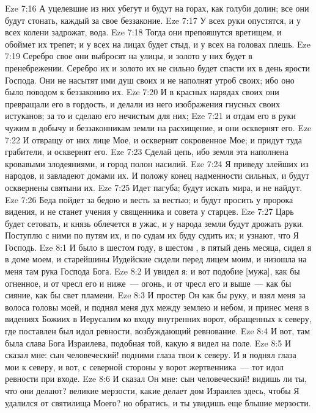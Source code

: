 \vs Eze 7:16 А уцелевшие из них убегут и будут на горах, как голуби долин; все они будут стонать, каждый за свое беззаконие.
\vs Eze 7:17 У всех руки опустятся, и у всех колени задрожат,  вода.
\vs Eze 7:18 Тогда они препояшутся вретищем, и обоймет их трепет; и у всех на лицах будет стыд, и у всех на головах плешь.
\vs Eze 7:19 Серебро свое они выбросят на улицы, и золото у них будет в пренебрежении. Серебро их и золото их не сильно будет спасти их в день ярости Господа. Они не насытят ими душ своих и не наполнят утроб своих; ибо оно было поводом к беззаконию их.
\vs Eze 7:20 И в красных нарядах своих они превращали его в гордость, и делали из него изображения гнусных своих истуканов; за то и сделаю его нечистым для них;
\vs Eze 7:21 и отдам его в руки чужим в добычу и беззаконникам земли на расхищение, и они осквернят его.
\vs Eze 7:22 И отвращу от них лице Мое, и осквернят сокровенное Мое; и придут туда грабители, и осквернят его.
\vs Eze 7:23 Сделай цепь, ибо земля эта наполнена кровавыми злодеяниями, и город полон насилий.
\vs Eze 7:24 Я приведу злейших из народов, и завладеют домами их. И положу конец надменности сильных, и будут осквернены святыни их.
\vs Eze 7:25 Идет пагуба; будут искать мира, и не найдут.
\vs Eze 7:26 Беда пойдет за бедою и весть за вестью; и будут просить у пророка видения, и не станет учения у священника и совета у старцев.
\vs Eze 7:27 Царь будет сетовать, и князь облечется в ужас, и у народа земли будут дрожать руки. Поступлю с ними по путям их, и по судам их буду судить их; и узнают, что Я Господь.
\vs Eze 8:1 И было в шестом году, в шестом , в пятый день месяца, сидел я в доме моем, и старейшины Иудейские сидели перед лицем моим, и низошла на меня там рука Господа Бога.
\vs Eze 8:2 И увидел я: и вот подобие [мужа], как бы огненное, и от чресл его и ниже~--- огонь, и от чресл его и выше~--- как бы сияние, как бы свет пламени.
\vs Eze 8:3 И простер Он как бы руку, и взял меня за волоса головы моей, и поднял меня дух между землею и небом, и принес меня в видениях Божиих в Иерусалим ко входу внутренних ворот, обращенных к северу, где поставлен был идол ревности, возбуждающий ревнование.
\vs Eze 8:4 И вот, там была слава Бога Израилева, подобная той, какую я видел на поле.
\vs Eze 8:5 И сказал мне: сын человеческий! подними глаза твои к северу. И я поднял глаза мои к северу, и вот, с северной стороны у ворот жертвенника~--- тот идол ревности при входе.
\vs Eze 8:6 И сказал Он мне: сын человеческий! видишь ли ты, что они делают? великие мерзости, какие делает дом Израилев здесь, чтобы Я удалился от святилища Моего? но обратись, и ты увидишь еще бльшие мерзости.
